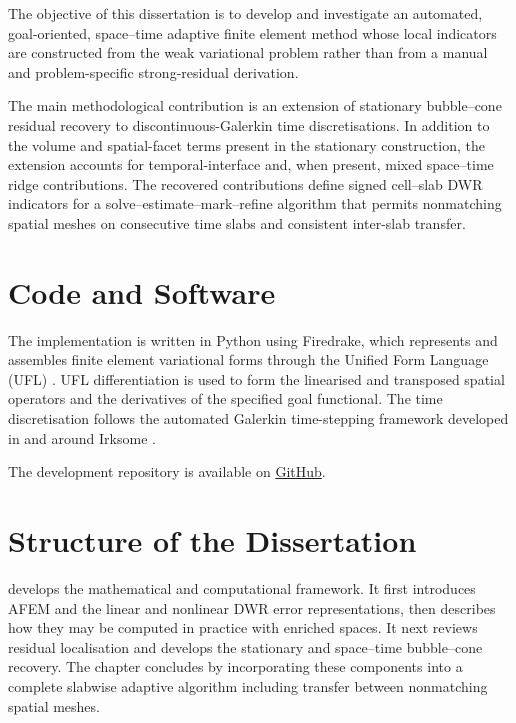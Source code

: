 The objective of this dissertation is to develop and investigate an automated, goal-oriented, space--time adaptive finite element method whose local indicators are constructed from the weak variational problem rather than from a manual and problem-specific strong-residual derivation. 

The main methodological contribution is an extension of stationary bubble--cone residual recovery to discontinuous-Galerkin time discretisations. In addition to the volume and spatial-facet terms present in the stationary construction, the extension accounts for temporal-interface and, when present, mixed space--time ridge contributions. The recovered contributions define signed cell--slab DWR indicators for a solve--estimate--mark--refine algorithm that permits nonmatching spatial meshes on consecutive time slabs and consistent inter-slab transfer.




\section{Code and Software}
\label{sec:introduction-code}

The implementation is written in Python using Firedrake, which represents and assembles finite element variational forms through the Unified Form Language (UFL) \cite{Firedrake}. UFL differentiation is used to form the linearised and transposed spatial operators and the derivatives of the specified goal functional. The time discretisation follows the automated Galerkin time-stepping framework developed in and around Irksome \cite{Farrell_Kirby_Marchena_2021,andrews2026automatedgalerkintimestepping}.

The development repository is available on \href{https://github.com/yuewu2/mmsc-dissertation}{GitHub}. 



\section{Structure of the Dissertation}
\label{sec:introduction-structure}

 develops the mathematical and computational framework. It first introduces AFEM and the linear and nonlinear DWR error representations, then describes how they may be computed in practice with enriched spaces. It next reviews residual localisation and develops the stationary and space--time bubble--cone recovery. The chapter concludes by incorporating these components into a complete slabwise adaptive algorithm including transfer between nonmatching spatial meshes.

